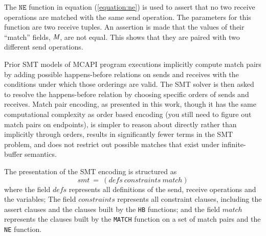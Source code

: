 
The $\mathtt{NE}$ function in equation (\ref{equation:ne}) is used to assert that no two receive operations are matched
with the same send operation. The parameters for this function are two receive
tuples. An assertion is made that the values of their ``match'' fields, $\emph{M}$,
are not equal. This shows that they are paired with two different send
operations.

Prior SMT models of MCAPI program executions implicitly compute
match pairs by adding possible happens-before relations on sends and
receives with the conditions under which those orderings are
valid. The SMT solver is then asked to resolve the happens-before
relation by choosing specific orders of sends and receives. Match pair
encoding, as presented in this work, though it has the same
computational complexity as order based encoding (you still need to
figure out match pairs on endpoints), is simpler to reason about
directly rather than implicitly through orders, results in
significantly fewer terms in the SMT problem, and does not restrict out possible matches that exist under infinite-buffer semantics.

The presentation of the SMT encoding is structured as
\[\mathit{smt}\ =\ (\mathit{defs}\ \mathit{constraints}\ \mathit{match})\]
where the field $\mathit{defs}$ represents all definitions of the send, receive operations and the variables; The field $\mathit{constraints}$ represents all constraint clauses, including the assert clauses and the clauses built by the \texttt{HB} functions; and the field $\mathit{match}$ represents the clauses built by the \texttt{MATCH} function on a set of match pairs and the \texttt{NE} function. %

